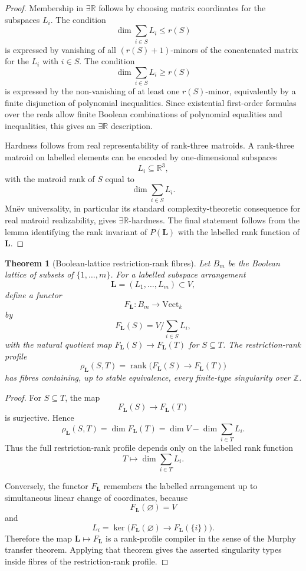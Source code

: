 \documentclass[11pt]{article}
\newtheorem{theorem}{Theorem}[section]
\DeclareMathOperator{\rank}{rank}
\begin{document}
\begin{proof}
Membership in \(\exists\mathbb R\) follows by choosing matrix coordinates for the subspaces \(L_i\). The condition
\[
\dim\sum_{i\in S}L_i\leq r(S)
\]
is expressed by vanishing of all \((r(S)+1)\)-minors of the concatenated matrix for the \(L_i\) with \(i\in S\). The condition
\[
\dim\sum_{i\in S}L_i\geq r(S)
\]
is expressed by the non-vanishing of at least one \(r(S)\)-minor, equivalently by a finite disjunction of polynomial inequalities. Since existential first-order formulas over the reals allow finite Boolean combinations of polynomial equalities and inequalities, this gives an \(\exists\mathbb R\) description.

Hardness follows from real representability of rank-three matroids. A rank-three matroid on labelled elements can be encoded by one-dimensional subspaces
\[
L_i\subseteq\mathbb R^3,
\]
with the matroid rank of \(S\) equal to
\[
\dim\sum_{i\in S}L_i.
\]
Mnëv universality, in particular its standard complexity-theoretic consequence for real matroid realizability, gives \(\exists\mathbb R\)-hardness. The final statement follows from the lemma identifying the rank invariant of \(P(\mathbf L)\) with the labelled rank function of \(\mathbf L\).
\end{proof}

\begin{theorem}[Boolean-lattice restriction-rank fibres]
Let \(B_m\) be the Boolean lattice of subsets of \(\{1,\ldots,m\}\). For a labelled subspace arrangement
\[
\mathbf L=(L_1,\ldots,L_m)\subset V,
\]
define a functor
\[
F_{\mathbf L}:B_m\to\mathrm{Vect}_k
\]
by
\[
F_{\mathbf L}(S)=V\Big/\sum_{i\in S}L_i,
\]
with the natural quotient map \(F_{\mathbf L}(S)\to F_{\mathbf L}(T)\) for \(S\subseteq T\). The restriction-rank profile
\[
\rho_{\mathbf L}(S,T)=
\rank\bigl(F_{\mathbf L}(S)\to F_{\mathbf L}(T)\bigr)
\]
has fibres containing, up to stable equivalence, every finite-type singularity over \(\mathbb Z\).
\end{theorem}

\begin{proof}
For \(S\subseteq T\), the map
\[
F_{\mathbf L}(S)\to F_{\mathbf L}(T)
\]
is surjective. Hence
\[
\rho_{\mathbf L}(S,T)
=
\dim F_{\mathbf L}(T)
=
\dim V-\dim\sum_{i\in T}L_i.
\]
Thus the full restriction-rank profile depends only on the labelled rank function
\[
T\mapsto\dim\sum_{i\in T}L_i.
\]

Conversely, the functor \(F_{\mathbf L}\) remembers the labelled arrangement up to simultaneous linear change of coordinates, because
\[
F_{\mathbf L}(\varnothing)=V
\]
and
\[
L_i=
\ker\bigl(F_{\mathbf L}(\varnothing)\to F_{\mathbf L}(\{i\})\bigr).
\]
Therefore the map \(\mathbf L\mapsto F_{\mathbf L}\) is a rank-profile compiler in the sense of the Murphy transfer theorem. Applying that theorem gives the asserted singularity types inside fibres of the restriction-rank profile.
\end{proof}
\end{document}
